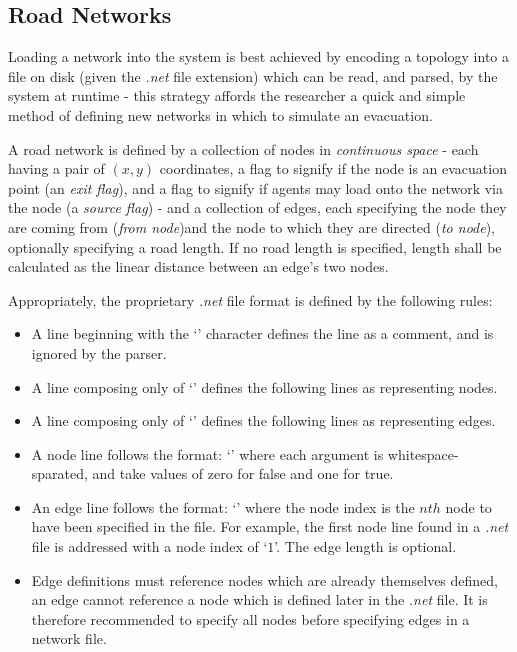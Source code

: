 \subsection{Road Networks}
Loading a network into the system is best achieved by encoding a topology into a file on disk (given the \textit{.net} file extension) which can be read, and parsed, by the system at runtime - this strategy affords the researcher a quick and simple method of defining new networks in which to simulate an evacuation.

A road network is defined by a collection of nodes in \textit{continuous space} - each having a pair of $(x,y)$ coordinates, a flag to signify if the node is an evacuation point (an \textit{exit flag}), and a flag to signify if agents may load onto the network via the node (a \textit{source flag}) - and a collection of edges, each specifying the node they are coming from (\textit{from node})and the node to which they are directed (\textit{to node}), optionally specifying a road length. If no road length is specified, length shall be calculated as the linear distance between an edge's two nodes.

Appropriately, the proprietary \textit{.net} file format is defined by the following rules:
\begin{itemize}
    \item A line beginning with the `\code{\#}' character defines the line as a comment, and is ignored by the parser.
    \item A line composing only of `' defines the following lines as representing nodes.
    \item A line composing only of `' defines the following lines as representing edges.
    \item A node line follows the format:
    `'
    where each argument is whitespace-sparated,  and \newline{} take values of zero for false and one for true.
    \item  An edge line follows the format:
    `'
    where the node index is the $nth$ node to have been specified in the file. For example, the first node line found in a \textit{.net} file is addressed with a node index of `$1$'. The edge length is optional.
    \item Edge definitions must reference nodes which are already themselves defined, an edge cannot reference a node which is defined later in the \textit{.net} file. It is therefore recommended to specify all nodes before specifying edges in a network file.
\end{itemize}

